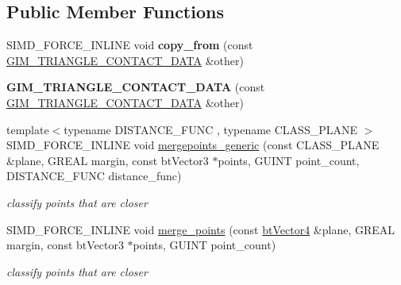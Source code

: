 \subsection*{Public Member Functions}
\begin{DoxyCompactItemize}
\item 
\hypertarget{struct_g_i_m___t_r_i_a_n_g_l_e___c_o_n_t_a_c_t___d_a_t_a_a1ee8cd81406ddf9e64f725f97d172db0}{S\+I\+M\+D\+\_\+\+F\+O\+R\+C\+E\+\_\+\+I\+N\+L\+I\+N\+E void {\bfseries copy\+\_\+from} (const \hyperlink{struct_g_i_m___t_r_i_a_n_g_l_e___c_o_n_t_a_c_t___d_a_t_a}{G\+I\+M\+\_\+\+T\+R\+I\+A\+N\+G\+L\+E\+\_\+\+C\+O\+N\+T\+A\+C\+T\+\_\+\+D\+A\+T\+A} \&other)}\label{struct_g_i_m___t_r_i_a_n_g_l_e___c_o_n_t_a_c_t___d_a_t_a_a1ee8cd81406ddf9e64f725f97d172db0}

\item 
\hypertarget{struct_g_i_m___t_r_i_a_n_g_l_e___c_o_n_t_a_c_t___d_a_t_a_a99ff857d8f9f1e8cdd34875a50fe3caf}{{\bfseries G\+I\+M\+\_\+\+T\+R\+I\+A\+N\+G\+L\+E\+\_\+\+C\+O\+N\+T\+A\+C\+T\+\_\+\+D\+A\+T\+A} (const \hyperlink{struct_g_i_m___t_r_i_a_n_g_l_e___c_o_n_t_a_c_t___d_a_t_a}{G\+I\+M\+\_\+\+T\+R\+I\+A\+N\+G\+L\+E\+\_\+\+C\+O\+N\+T\+A\+C\+T\+\_\+\+D\+A\+T\+A} \&other)}\label{struct_g_i_m___t_r_i_a_n_g_l_e___c_o_n_t_a_c_t___d_a_t_a_a99ff857d8f9f1e8cdd34875a50fe3caf}

\item 
\hypertarget{struct_g_i_m___t_r_i_a_n_g_l_e___c_o_n_t_a_c_t___d_a_t_a_a159d51dfe240909dda5436304a655500}{{\footnotesize template$<$typename D\+I\+S\+T\+A\+N\+C\+E\+\_\+\+F\+U\+N\+C , typename C\+L\+A\+S\+S\+\_\+\+P\+L\+A\+N\+E $>$ }\\S\+I\+M\+D\+\_\+\+F\+O\+R\+C\+E\+\_\+\+I\+N\+L\+I\+N\+E void \hyperlink{struct_g_i_m___t_r_i_a_n_g_l_e___c_o_n_t_a_c_t___d_a_t_a_a159d51dfe240909dda5436304a655500}{mergepoints\+\_\+generic} (const C\+L\+A\+S\+S\+\_\+\+P\+L\+A\+N\+E \&plane, G\+R\+E\+A\+L margin, const bt\+Vector3 $\ast$points, G\+U\+I\+N\+T point\+\_\+count, D\+I\+S\+T\+A\+N\+C\+E\+\_\+\+F\+U\+N\+C distance\+\_\+func)}\label{struct_g_i_m___t_r_i_a_n_g_l_e___c_o_n_t_a_c_t___d_a_t_a_a159d51dfe240909dda5436304a655500}

\begin{DoxyCompactList}\small\item\em classify points that are closer \end{DoxyCompactList}\item 
\hypertarget{struct_g_i_m___t_r_i_a_n_g_l_e___c_o_n_t_a_c_t___d_a_t_a_a4d3e25d735f8e5111bb54dd764cbb041}{S\+I\+M\+D\+\_\+\+F\+O\+R\+C\+E\+\_\+\+I\+N\+L\+I\+N\+E void \hyperlink{struct_g_i_m___t_r_i_a_n_g_l_e___c_o_n_t_a_c_t___d_a_t_a_a4d3e25d735f8e5111bb54dd764cbb041}{merge\+\_\+points} (const \hyperlink{classbt_vector4}{bt\+Vector4} \&plane, G\+R\+E\+A\+L margin, const bt\+Vector3 $\ast$points, G\+U\+I\+N\+T point\+\_\+count)}\label{struct_g_i_m___t_r_i_a_n_g_l_e___c_o_n_t_a_c_t___d_a_t_a_a4d3e25d735f8e5111bb54dd764cbb041}

\begin{DoxyCompactList}\small\item\em classify points that are closer \end{DoxyCompactList}\end{DoxyCompactItemize}
